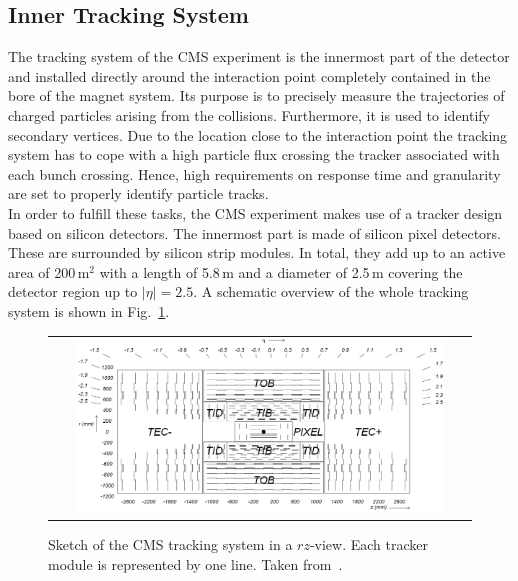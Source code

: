 \subsection{Inner Tracking System}
\label{subsec:cms_tracker}
The tracking system of the CMS experiment is the innermost part of the detector and installed directly around the interaction point completely contained in the bore of the magnet system. Its purpose is to precisely measure the trajectories of charged particles arising from the collisions. Furthermore, it is used to identify secondary vertices. Due to the location close to the interaction point the tracking system has to cope with a high particle flux crossing the tracker associated with each bunch crossing. Hence, high requirements on response time and granularity are set to properly identify particle tracks. \\
In order to fulfill these tasks, the CMS experiment makes use of a tracker design based on silicon detectors. The innermost part is made of silicon pixel detectors. These are surrounded by silicon strip modules. In total, they add up to an active area of 200\,$\mathrm{m}^2$ with a length of 5.8\,m and a diameter of 2.5\,m covering the detector region up to $|\eta| = 2.5$. A schematic overview of the whole tracking system is shown in Fig.~\ref{fig:CMS_tracker}. 
\begin{figure}[!tp]
  \centering
  \begin{tabular}{c}
    \includegraphics[width=0.9\textwidth]{figures/Figures_Experimental_Apparatus_Tracker.png}
  \end{tabular}
  \caption{Sketch of the CMS tracking system in a $rz$-view. Each tracker module is represented by one line. Taken from~\cite{Chatrchyan:2008zzk}.}
  \label{fig:CMS_tracker}
\end{figure}
